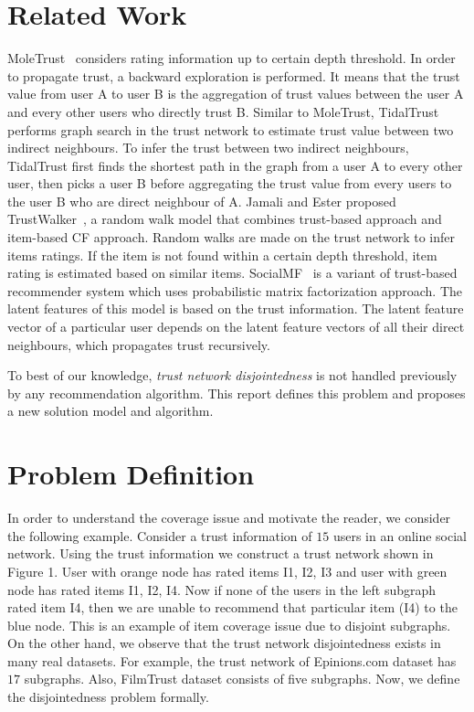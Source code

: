 \documentclass[11pt, conference, onecolumn]{IEEEtran}
\begin{document}
\section{Related Work} \label{sec:related}
MoleTrust~\cite{Massa:2007} considers rating information up to certain depth threshold. In order to propagate trust, a backward exploration is performed. It means that the trust value from user A to user B is the aggregation of trust values between the user A and every other users who directly trust B. Similar to MoleTrust, TidalTrust~\cite{Golbeck:2005} performs graph search in the trust network to estimate trust value between two indirect neighbours. To infer the trust between two indirect neighbours, TidalTrust first finds the shortest path in the graph from a user A to every other user, then picks a user B before aggregating the trust value from every users to the user B who are direct neighbour of A. Jamali and Ester proposed TrustWalker~\cite{Jamali:2009}, a random walk model that combines trust-based approach and item-based CF approach. Random walks are made on the trust network to infer items ratings. If the item is not found within a certain depth threshold, item rating is estimated based on similar items. SocialMF~\cite{Jamali:2010} is a variant of trust-based recommender system which uses probabilistic matrix factorization approach. The latent features of this model is based on the trust information. The latent feature vector of a particular user depends on the latent feature vectors of all their direct neighbours, which propagates trust recursively.

To best of our knowledge, \textit{trust network disjointedness} is not handled previously by any recommendation algorithm. This report defines this problem and proposes a new solution model and algorithm.

\section{Problem Definition} \label{sec:problem}


In order to understand the coverage issue and motivate the reader, we consider the following example. Consider a trust information of $15$ users in an online social network. Using the trust information we construct a trust network shown in Figure 1. User with orange node has rated items I1, I2, I3 and user with green node has rated items I1, I2, I4. Now if none of the users in the left subgraph rated item I4, then we are unable to recommend that particular item (I4) to the blue node. This is an example of item coverage issue due to disjoint subgraphs. On the other hand, we observe that the trust network disjointedness exists in many real datasets. For example, the trust network of Epinions.com dataset has $17$ subgraphs. Also, FilmTrust dataset consists of five subgraphs. Now, we define the disjointedness problem formally.
\end{document}
